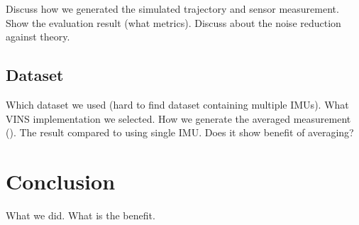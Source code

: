 \documentclass[conference]{IEEEtran}
\begin{document}
Discuss how we generated the simulated trajectory and sensor measurement. Show the evaluation result (what metrics). Discuss about the noise reduction against theory.

\subsection{Dataset}

Which dataset we used (hard to find dataset containing multiple IMUs). What VINS implementation we selected. How we generate the averaged measurement (). The result compared to using single IMU. Does it show benefit of averaging?

\section{Conclusion}

What we did. What is the benefit.



\end{document}
